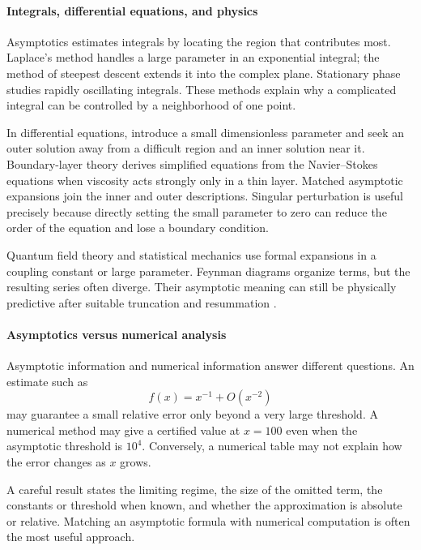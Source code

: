 \paragraph{Integrals, differential equations, and physics}

Asymptotics estimates integrals by locating the region that contributes most. Laplace's method handles a large parameter in an exponential integral; the method of steepest descent extends it into the complex plane. Stationary phase studies rapidly oscillating integrals. These methods explain why a complicated integral can be controlled by a neighborhood of one point.

In differential equations, introduce a small dimensionless parameter and seek an outer solution away from a difficult region and an inner solution near it. Boundary-layer theory derives simplified equations from the Navier--Stokes equations when viscosity acts strongly only in a thin layer. Matched asymptotic expansions join the inner and outer descriptions. Singular perturbation is useful precisely because directly setting the small parameter to zero can reduce the order of the equation and lose a boundary condition.

Quantum field theory and statistical mechanics use formal expansions in a coupling constant or large parameter. Feynman diagrams organize terms, but the resulting series often diverge. Their asymptotic meaning can still be physically predictive after suitable truncation and resummation \cite{asymptotic_theory_ref3,asymptotic_theory_ref5}.

\paragraph{Asymptotics versus numerical analysis}

Asymptotic information and numerical information answer different questions. An estimate such as
\[
 f(x)=x^{-1}+O(x^{-2})
\]
may guarantee a small relative error only beyond a very large threshold. A numerical method may give a certified value at $x=100$ even when the asymptotic threshold is $10^4$. Conversely, a numerical table may not explain how the error changes as $x$ grows.

A careful result states the limiting regime, the size of the omitted term, the constants or threshold when known, and whether the approximation is absolute or relative. Matching an asymptotic formula with numerical computation is often the most useful approach.

